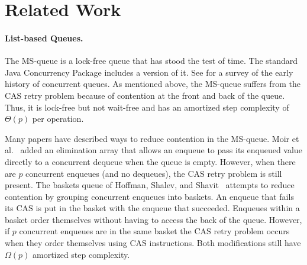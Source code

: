 
\section{Related Work}

\paragraph{List-based Queues.}
The MS-queue \cite{MS98} is a lock-free queue that has stood the test of time.
The standard Java Concurrency Package includes a version of it.  %
See \cite{MS98} for a survey of the early history of concurrent queues.
As mentioned above, the MS-queue suffers from the CAS retry problem because of contention at the front and back of the queue.
Thus, it is lock-free but not wait-free and has an amortized step complexity of $\Theta(p)$ per operation.


Many papers have described ways to reduce contention in the MS-queue.
Moir et al.~\cite{DBLP:conf/spaa/MoirNSS05} 
added an elimination array that allows an enqueue to pass its enqueued value directly
to a concurrent dequeue when the queue is empty.
However, when there are $p$ concurrent enqueues (and no dequeues), the CAS retry problem
is still present.
The baskets queue of
Hoffman, Shalev, and Shavit~\cite{DBLP:conf/opodis/HoffmanSS07} 
attempts to reduce contention by grouping concurrent enqueues into baskets.
An enqueue that fails its CAS is put in the basket with the enqueue that succeeded.
Enqueues within a basket order  themselves without having to access the back of the queue.
However, if $p$ concurrent enqueues are in the same basket
the CAS retry problem occurs when they order themselves using CAS instructions.
Both modifications still have $\Omega(p)$ amortized step complexity.

